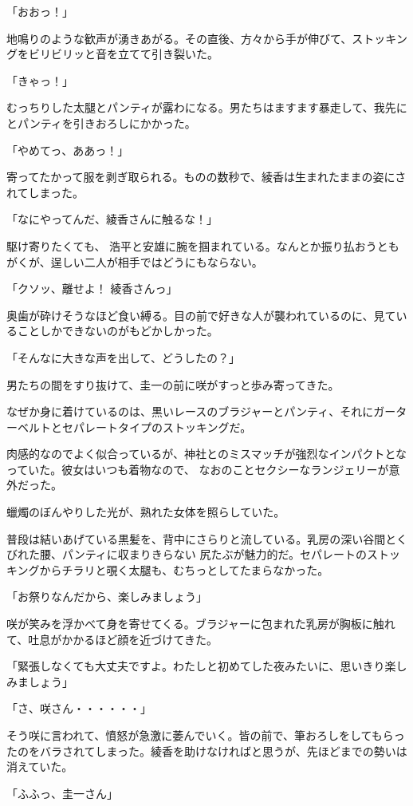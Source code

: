 ﻿\documentclass[book,tate]{jlreq}
\begin{document}
「おおっ！」

地鳴りのような歓声が湧きあがる。その直後、方々から手が伸びて、ストッキングをビリビリッと音を立てて引き裂いた。

「きゃっ！」

むっちりした太腿とパンティが露わになる。男たちはますます暴走して、我先にとパンティを引きおろしにかかった。

「やめてっ、ああっ！」

寄ってたかって服を剥ぎ取られる。ものの数秒で、綾香は生まれたままの姿にされてしまった。

「なにやってんだ、綾香さんに触るな！」

駆け寄りたくても、 浩平と安雄に腕を掴まれている。なんとか振り払おうともがくが、逞しい二人が相手ではどうにもならない。

「クソッ、離せよ！ 綾香さんっ」

奥歯が砕けそうなほど食い縛る。目の前で好きな人が襲われているのに、見ていることしかできないのがもどかしかった。

「そんなに大きな声を出して、どうしたの？」

男たちの間をすり抜けて、圭一の前に咲がすっと歩み寄ってきた。

なぜか身に着けているのは、黒いレースのブラジャーとパンティ、それにガーターベルトとセパレートタイプのストッキングだ。

肉感的なのでよく似合っているが、神社とのミスマッチが強烈なインパクトとなっていた。彼女はいつも着物なので、 なおのことセクシーなランジェリーが意外だった。

蠟燭のぼんやりした光が、熟れた女体を照らしていた。

普段は結いあげている黒髪を、背中にさらりと流している。乳房の深い谷間とくびれた腰、パンティに収まりきらない 尻たぶが魅力的だ。セパレートのストッキングからチラリと覗く太腿も、むちっとしてたまらなかった。

「お祭りなんだから、楽しみましょう」

咲が笑みを浮かべて身を寄せてくる。ブラジャーに包まれた乳房が胸板に触れて、吐息がかかるほど顔を近づけてきた。

「緊張しなくても大丈夫ですよ。わたしと初めてした夜みたいに、思いきり楽しみましょう」

「さ、咲さん・・・・・・」

そう咲に言われて、憤怒が急激に萎んでいく。皆の前で、筆おろしをしてもらったのをバラされてしまった。綾香を助けなければと思うが、先ほどまでの勢いは消えていた。

「ふふっ、圭一さん」
\end{document}
